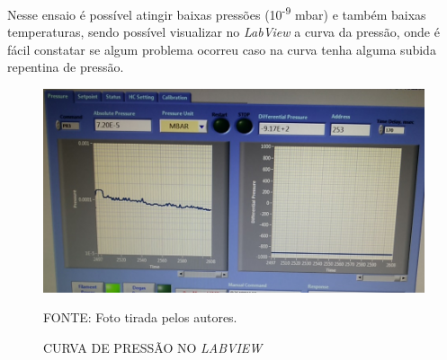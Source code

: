 \documentclass[
	12pt,				%
	openright,			%
	oneside,			%
	a4paper,			%
	english,			%
	french,				%
	spanish,			%
	brazil,				%
	oldfontcommands
	]{abntex2}
\begin{document}
\begin{apendicesenv}
	Nesse ensaio é possível atingir baixas pressões (10\textsuperscript{-9} mbar) e também baixas temperaturas, sendo possível visualizar no \textit{LabView} a curva da pressão, onde é fácil constatar se algum problema ocorreu caso na curva tenha alguma subida repentina de pressão.
	
	\begin{figure}[th]
		\caption{CURVA DE PRESSÃO NO \textit{LABVIEW}}
		\label{Fig_SubConj}
		\centering
		\includegraphics[width=0.8\linewidth]{./figs/labview}
			
		\begin{small}
			FONTE: Foto tirada pelos autores.
		\end{small}		
	\end{figure}
	
	
\end{apendicesenv}



% 









\printindex
\end{document}
